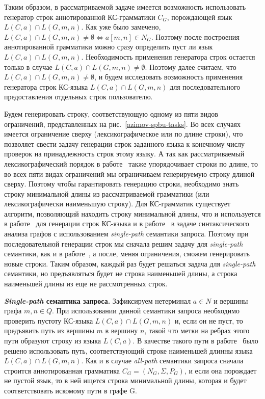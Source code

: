 Таким образом, в рассматриваемой задаче имеется возможность использовать генератор строк аннотированной КС-грамматики $C_{G}$, порождающей язык $L(C,a) \cap L(G,m,n)$. Как уже было замечено, $L(C,a) \cap L(G,m,n) \ne \emptyset \Leftrightarrow a[m,n] \in N_{G}$. Поэтому после построения аннотированной грамматики можно сразу определить пуст ли язык $L(C,a) \cap L(G,m,n)$. Необходимость применения генератора строк остается только в случае $L(C,a) \cap L(G,m,n) \ne \emptyset$. Поэтому далее считаем, что $L(C,a) \cap L(G,m,n) \ne \emptyset$, и будем исследовать возможность применения генератора строк КС-языка $L(C,a) \cap L(G,m,n)$ для последовательного предоставления отдельных строк пользователю.

Будем генерировать строку, соответствующую одному из пяти видов ограничений, представленных на рис.~\ref{azimov-spbu-tasks}. Во всех случаях имеется ограничение сверху (лексикографическое или по длине строки), что позволяет свести задачу генерации строк заданного языка к конечному числу проверок на принадлежность строк этому языку. А так как рассматриваемый лексикографический порядок в работе~\cite{azimov-spbu-Okhotin} также упорядочивает строки по длине, то во всех пяти видах ограничений мы ограничиваем генерируемую строку длиной сверху. Поэтому чтобы гарантировать генерацию строки, необходимо знать строку минимальной длины из рассматриваемой грамматики (или лексикографически наименьшую строку). Для КС-грамматик существует алгоритм, позволяющий находить строку минимальной длины, что и используется в работе~\cite{azimov-spbu-Okhotin} для генерации строк КС-языка и в работе~\cite{azimov-spbu-hellings2} в задаче синтаксического анализа графов с использованием \textit{single-path} семантики запроса. Поэтому при последовательной генерации строк мы сначала решим задачу для \textit{single-path} семантики, как и в работе~\cite{azimov-spbu-hellings2}, а после, меняя ограничения, сможем генерировать новые строки. Таким образом, каждый раз будет решаться задача для \textit{single-path} семантики, но предъявляться будет не строка наименьшей длины, а строка наименьшей длины из еще не рассмотренных строк.

\textbf{\textit{Single-path} семантика запроса.} Зафиксируем нетерминал $a \in N$ и вершины графа $m, n \in Q$. При использовании данной семантики запроса необходимо проверить пустоту КС-языка $L(C,a) \cap L(G,m,n)$ и, если он не пуст, то предъявить путь из вершины $m$ в вершину $n$, такой что метки на ребрах этого пути образуют строку из языка $L(C,a)$. В качестве такого пути в работе~\cite{azimov-spbu-hellings2} было решено использовать путь, соответствующий строке наименьшей длинны языка $L(C,a) \cap L(G,m,n)$. Как и в случае \textit{all-path} семантики запроса сначала строится аннотированная грамматика $C_{G} = (N_{G}, \Sigma, P_{G})$, и если она порождает не пустой язык, то в ней ищется строка минимальной длины, которая и будет соответствовать искомому пути в графе G.

